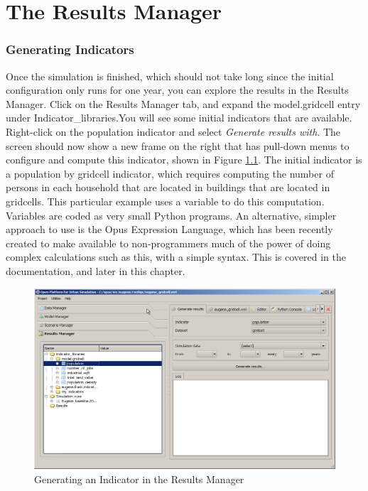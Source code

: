 \chapter{The Results Manager}

\subsection{Generating Indicators}
Once the simulation is finished, which should not take long since the initial configuration only runs for one year, you can explore the results in the Results Manager.  Click on the Results Manager tab, and expand the model.gridcell entry under Indicator\_libraries.You will see some initial indicators that are available.  Right-click on the population indicator and select \emph{Generate results with}.  The screen should now show a new frame on the right that has pull-down menus to configure and compute this indicator, shown in Figure \ref{fig:opus-generate-indicator}.  The initial indicator is a population by gridcell indicator, which requires computing the number of persons in each household that are located in buildings that are located in gridcells.  This particular example uses a variable to do this computation.  Variables are coded as very small Python programs.  An alternative, simpler approach to use is the Opus Expression Language, which has been recently created to make available to non-programmers much of the power of doing complex calculations such as this, with a simple syntax.  This is covered in the documentation, and later in this chapter. 

\begin{figure}[htp]
\begin{center}
\includegraphics[scale=0.4]{graphics/opus-generate-indicator.png}
\end{center}
\caption{Generating an Indicator in the Results Manager}
\label{fig:opus-generate-indicator}
\end{figure}

